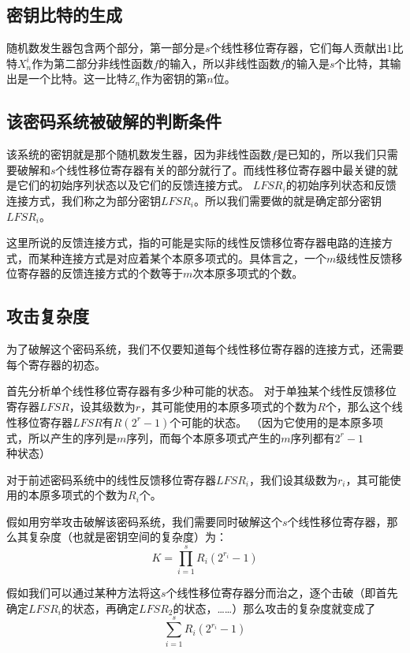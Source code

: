 \documentclass{article}
\begin{document}
\subsection*{密钥比特的生成}
随机数发生器包含两个部分，第一部分是$s$个线性移位寄存器，它们每人贡献出$1$比特$X_n^i$作为第二部分非线性函数$f$的输入，所以非线性函数$f$的输入是$s$个比特，其输出是一个比特。这一比特$Z_n$作为密钥的第$n$位。
\subsection*{该密码系统被破解的判断条件}
该系统的密钥就是那个随机数发生器，因为非线性函数$f$是已知的，所以我们只需要破解和$s$个线性移位寄存器有关的部分就行了。而线性移位寄存器中最关键的就是它们的初始序列状态以及它们的反馈连接方式。
$LFSR_i$的初始序列状态和反馈连接方式，我们称之为部分密钥$LFSR_i$。所以我们需要做的就是确定部分密钥$LFSR_i$。

这里所说的反馈连接方式，指的可能是实际的线性反馈移位寄存器电路的连接方式，而某种连接方式是对应着某个本原多项式的。具体言之，一个$m$级线性反馈移位寄存器的反馈连接方式的个数等于$m$次本原多项式的个数。

\subsection*{攻击复杂度}

为了破解这个密码系统，我们不仅要知道每个线性移位寄存器的连接方式，还需要每个寄存器的初态。

首先分析单个线性移位寄存器有多少种可能的状态。
对于单独某个线性反馈移位寄存器$LFSR$，设其级数为$r$，其可能使用的本原多项式的个数为$R$个，那么这个线性移位寄存器$LFSR$有$R(2^r-1)$个可能的状态。
（因为它使用的是本原多项式，所以产生的序列是$m$序列，而每个本原多项式产生的$m$序列都有$2^{r}-1$种状态）


对于前述密码系统中的线性反馈移位寄存器$LFSR_i$，我们设其级数为$r_i$，其可能使用的本原多项式的个数为$R_i$个。

假如用穷举攻击破解该密码系统，我们需要同时破解这个$s$个线性移位寄存器，那么其复杂度（也就是密钥空间的复杂度）为：
\[K=\prod_{i=1}^{s}R_i(2^{r_i}-1)\]

假如我们可以通过某种方法将这$s$个线性移位寄存器分而治之，逐个击破（即首先确定$LFSR_i$的状态，再确定$LFSR_2$的状态，……）那么攻击的复杂度就变成了
\[\sum_{i=1}^{s}R_i(2^{r_i}-1)\]
\end{document}
